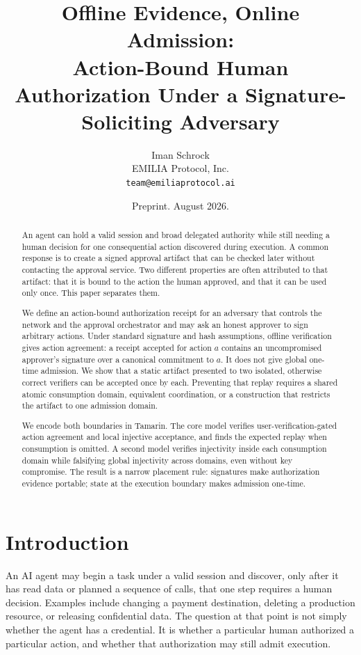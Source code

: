 \documentclass[10.5pt]{article}
\title{Offline Evidence, Online Admission:\\
Action-Bound Human Authorization Under a Signature-Soliciting Adversary}
\author{Iman Schrock\\
EMILIA Protocol, Inc.\\
\texttt{team@emiliaprotocol.ai}}
\date{Preprint. August 2026.}
\begin{document}
\maketitle

\begin{abstract}
An agent can hold a valid session and broad delegated authority while still
needing a human decision for one consequential action discovered during
execution. A common response is to create a signed approval artifact that can be
checked later without contacting the approval service. Two different properties
are often attributed to that artifact: that it is bound to the action the human
approved, and that it can be used only once. This paper separates them.

We define an action-bound authorization receipt for an adversary that controls
the network and the approval orchestrator and may ask an honest approver to sign
arbitrary actions. Under standard signature and hash assumptions, offline
verification gives action agreement: a receipt accepted for action $a$ contains
an uncompromised approver's signature over a canonical commitment to $a$. It does
not give global one-time admission. We show that a static artifact presented to
two isolated, otherwise correct verifiers can be accepted once by each. Preventing
that replay requires a shared atomic consumption domain, equivalent coordination,
or a construction that restricts the artifact to one admission domain.

We encode both boundaries in Tamarin. The core model verifies
user-verification-gated action agreement and local injective acceptance, and finds the expected
replay when consumption is omitted. A second model verifies injectivity inside
each consumption domain while falsifying global injectivity across domains, even
without key compromise. The result is a narrow placement rule: signatures make
authorization evidence portable; state at the execution boundary makes admission
one-time.
\end{abstract}

\section{Introduction}

An AI agent may begin a task under a valid session and discover, only after it has
read data or planned a sequence of calls, that one step requires a human decision.
Examples include changing a payment destination, deleting a production resource,
or releasing confidential data. The question at that point is not simply whether
the agent has a credential. It is whether a particular human authorized a
particular action, and whether that authorization may still admit execution.
\end{document}
